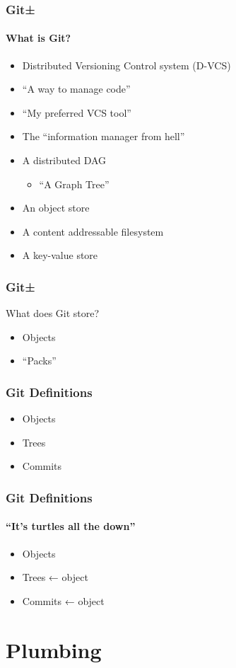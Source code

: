 \documentclass{beamer}
\begin{document}
\begin{frame}
\frametitle{Git±}
\framesubtitle{What is Git?}
\begin{itemize}
\item<2->{Distributed Versioning Control system (D-VCS)}
\item<3->{``A way to manage code''}
\item<4->{``My preferred VCS tool''}
\item<5->{The ``information manager from hell''}
\item<6->{A distributed DAG}
\begin{itemize}
\item<6->{``A Graph Tree''}
\end{itemize}
\item<7->{An object store}
\item<8->{A content addressable filesystem}
\item<9->{A key-value store}
\end{itemize}
\end{frame}

\begin{frame}
\frametitle{Git±}
What does Git store?
\begin{itemize}
\item<2-4>{Objects}
\item<3-3>{``Packs''}
\end{itemize}
\end{frame}

\begin{frame}
\frametitle{Git Definitions}
\begin{itemize}
\item{Objects}
\item{Trees}
\item{Commits}
\end{itemize}
\end{frame}

\begin{frame}
\frametitle{Git Definitions}
\framesubtitle{``It's turtles all the down''}
\begin{itemize}
\item{Objects}
\item{Trees ← object}
\item{Commits ← object}
\end{itemize}
\end{frame}

\section{Plumbing}
\end{document}
